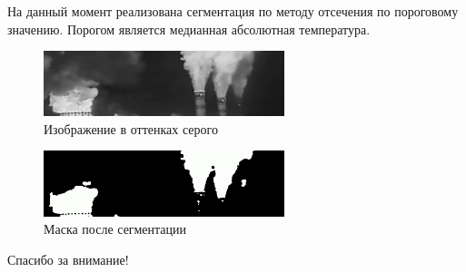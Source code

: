 \documentclass[t]{beamer}
\begin{document}
	\begin{frame}
		На данный момент реализована сегментация по методу отсечения по пороговому значению. Порогом является медианная абсолютная температура.
		\begin{figure}[h!]
			\centering
			\includegraphics[width = 7cm]{image/img}	
			\caption{Изображение в оттенках серого}
			\label{fig:segbef}
		\end{figure}
		\begin{figure}[h!]
			\centering
			\includegraphics[width = 7cm]{image/seg}	
			\caption{Маска после сегментации}
			\label{fig:segaft}
		\end{figure}
	\end{frame}
	\begin{frame}
	\begin{center}
		\vspace{3cm}
		\Huge{Спасибо за внимание!}
	\end{center}
	\end{frame}
\end{document}
